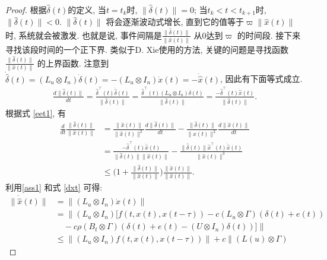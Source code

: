         \begin{proof}
        根据$\hat{{\delta}}(t)$的定义, 当$t=t_k$时, $\|\hat{{\delta}}(t)\|=0$; 当$t_k<t<t_{k+1}$时, $\|\hat{{\delta}}(t)\|<0$. $\|\hat{{\delta}}(t)\|$ 将会逐渐波动式增长, 直到它的值等于$\varpi\|\hat{x}(t)\|$时, 系统就会被激发. 也就是说, 事件间隔是$\frac{\|\hat{{\delta}}(t)\|}{\|\hat{x}(t)\|}$ 从$0$达到$\varpi$ 的时间段. 接下来寻找该段时间的一个正下界. 类似于D. Xie使用的方法, 关键的问题是寻找函数$\frac{\|\hat{{\delta}}(t)\|}{\|\hat{x}(t)\|}$ 的上界函数. 注意到$\dot{\hat{{\delta}}}(t)=(L_{u}\otimes I_n)\dot{{\delta}}(t)=-(L_{u}\otimes I_n)\dot{x}(t)=-\dot{\hat{x}}(t)$, 因此有下面等式成立.
        \begin{align}\label{eet1}
        \frac{d\|\hat{{\delta}}(t)\|}{dt}=\frac{\hat{{\delta}}^\top(t)\dot{\hat\delta}(t)}{\|\hat{{\delta}}(t)\|}
        =\frac{\hat{{\delta}}^\top(t)(L_{u}\otimes I_n)\dot{\delta}(t)}{\|\hat{{\delta}}(t)\|}
        =\frac{-\hat{{\delta}}^\top(t)\dot{\hat{x}}(t)}{\|\hat{{\delta}}(t)\|}.
        \end{align}
        根据式 \eqref{eet1}, 有
         \begin{align}\label{ex}
        \nonumber\frac{d}{dt}\frac{\|\hat{{\delta}}(t)\|}{\|\hat{x}(t)\|}&=\frac{\|\hat{x}(t)\|}{\|\hat{x}(t)\|^2}\frac{d\|\hat{{\delta}}(t)\|}{dt}-\frac{\|\hat{{\delta}}(t)\|}{\|\hat{x}(t)\|^2}\frac{d\|\hat{x}(t)\|}{dt}\\
        \nonumber&=\frac{-\hat{{\delta}}^\top(t)\dot{\hat{x}}(t)}{\|\hat{{\delta}}(t)\|\|\hat{x}(t)\|}-\frac{\|\hat{{\delta}}(t)\|\hat{x}^\top(t)\dot{\hat{x}}(t)}{\|\hat{x}(t)\|^3}\\
        &\leq\Big(1+\frac{\|\hat{{\delta}}(t)\|}{\|\hat{x}(t)\|}\Big)\frac{\|\dot{\hat{x}}(t)\|}{\|\hat{x}(t)\|}.
        \end{align}
        利用\autoref{ass1} 和式 \eqref{dxt} 可得:
        \begin{align}\label{eet0}
        \nonumber\|\dot{\hat{x}}(t)\|&=\|(L_{u}\otimes I_n)\dot{x}(t)\|\\
        \nonumber&=\Big\|(L_{u}\otimes I_n)\big[f(t,x(t),x(t-\tau))
        -c(L_{u}\otimes\Gamma)({\delta}(t)+e(t))\\
        \nonumber&\quad-c\rho(B_t\otimes\Gamma)({\delta}(t)+e(t)-(U\otimes I_n){\delta}(t))\big]\Big\|\\
        \nonumber&\leq\|(L_{u}\otimes I_n)f(t,x(t),x(t-\tau))\|+c\|(L(u)\otimes \Gamma)

\end{align}
\end{proof}
